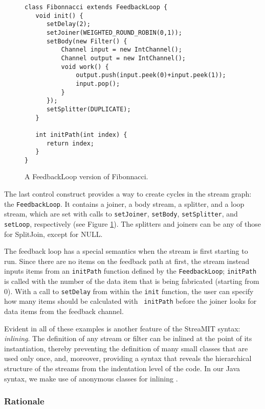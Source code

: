 \begin{figure}
\scriptsize
\begin{verbatim}
class Fibonnacci extends FeedbackLoop {
   void init() {
      setDelay(2);
      setJoiner(WEIGHTED_ROUND_ROBIN(0,1));
      setBody(new Filter() {
          Channel input = new IntChannel();
          Channel output = new IntChannel();
          void work() {
              output.push(input.peek(0)+input.peek(1));
              input.pop();
          }
      });
      setSplitter(DUPLICATE);
   }

   int initPath(int index) {
      return index;
   }
}
\end{verbatim}
\vspace{-12pt}
\caption{\protect\small A FeedbackLoop version of Fibonnacci.
\protect\label{fig:feed}}
\vspace{-12pt}
\end{figure}

The last control construct provides a way to create cycles in the
stream graph: the {\tt FeedbackLoop}.  It contains a joiner, a body
stream, a splitter, and a loop stream, which are set with calls to
{\tt setJoiner}, {\tt setBody}, {\tt setSplitter}, and {\tt setLoop},
respectively (see Figure \ref{fig:feed}).  The splitters and joiners
can be any of those for SplitJoin, except for NULL.

The feedback loop has a special semantics when the stream is first
starting to run.  Since there are no items on the feedback path at
first, the stream instead inputs items from an {\tt initPath} function
defined by the {\tt FeedbackLoop}; {\tt initPath} is called with the
number of the data item that is being fabricated (starting from 0).
With a call to {\tt setDelay} from within the {\tt init} function, the
user can specify how many items should be calculated with {\tt
initPath} before the joiner looks for data items from the feedback
channel.

Evident in all of these examples is another feature of the StreaMIT
syntax: {\it inlining}.  The definition of any stream or filter can be
inlined at the point of its instantiation, thereby preventing the
definition of many small classes that are used only once, and,
moreover, providing a syntax that reveals the hierarchical structure
of the streams from the indentation level of the code.  In our Java
syntax, we make use of anonymous classes for inlining \cite{java}.

\subsubsection{Rationale}

